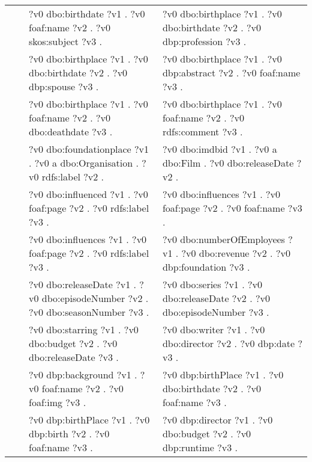 \begin{table}
{\begin{tabular}{!{\color{white}\vrule}l!{\color{white}\vrule}c@{\hs}!{\color{white}\vrule}p{11.5cm}!{\color{white}\vrule}p{11.5cm}!{\color{white}\vrule}}
			 &  \phantom{a} &     ?v0 dbo:birthdate ?v1 .  ?v0 foaf:name ?v2 .  ?v0 skos:subject ?v3 . &  ?v0 dbo:birthplace ?v1 .  ?v0 dbo:birthdate ?v2 .  ?v0 dbp:profession ?v3 . \\
			 &  \phantom{a} &     ?v0 dbo:birthplace ?v1 .  ?v0 dbo:birthdate ?v2 .  ?v0 dbp:spouse ?v3 . &  ?v0 dbo:birthplace ?v1 .  ?v0 dbp:abstract ?v2 .  ?v0 foaf:name ?v3 . \\
			 &  \phantom{a} &     ?v0 dbo:birthplace ?v1 .  ?v0 foaf:name ?v2 .  ?v0 dbo:deathdate ?v3 . &  ?v0 dbo:birthplace ?v1 .  ?v0 foaf:name ?v2 .  ?v0 rdfs:comment ?v3 . \\
			 &  \phantom{a} &     ?v0 dbo:foundationplace ?v1 .  ?v0 a dbo:Organisation .  ?v0 rdfs:label ?v2 . &  ?v0 dbo:imdbid ?v1 .  ?v0 a dbo:Film .  ?v0 dbo:releaseDate ?v2 . \\
			 &  \phantom{a} &     ?v0 dbo:influenced ?v1 .  ?v0 foaf:page ?v2 .  ?v0 rdfs:label ?v3 . &  ?v0 dbo:influences ?v1 .  ?v0 foaf:page ?v2 .  ?v0 foaf:name ?v3 . \\
			 &  \phantom{a} &     ?v0 dbo:influences ?v1 .  ?v0 foaf:page ?v2 .  ?v0 rdfs:label ?v3 . &  ?v0 dbo:numberOfEmployees ?v1 .  ?v0 dbo:revenue ?v2 .  ?v0 dbp:foundation ?v3 . \\
			 &  \phantom{a} &     ?v0 dbo:releaseDate ?v1 .  ?v0 dbo:episodeNumber ?v2 .  ?v0 dbo:seasonNumber ?v3 . &  ?v0 dbo:series ?v1 .  ?v0 dbo:releaseDate ?v2 .  ?v0 dbo:episodeNumber ?v3 . \\
			 &  \phantom{a} &     ?v0 dbo:starring ?v1 .  ?v0 dbo:budget ?v2 .  ?v0 dbo:releaseDate ?v3 . &  ?v0 dbo:writer ?v1 .  ?v0 dbo:director ?v2 .  ?v0 dbp:date ?v3 . \\
			 &  \phantom{a} &     ?v0 dbp:background ?v1 .  ?v0 foaf:name ?v2 .  ?v0 foaf:img ?v3 . &  ?v0 dbp:birthPlace ?v1 .  ?v0 dbo:birthdate ?v2 .  ?v0 foaf:name ?v3 . \\
			 &  \phantom{a} &     ?v0 dbp:birthPlace ?v1 .  ?v0 dbp:birth ?v2 .  ?v0 foaf:name ?v3 . &  ?v0 dbp:director ?v1 .  ?v0 dbo:budget ?v2 .  ?v0 dbp:runtime ?v3 . \\

\end{tabular}}
\end{table}
